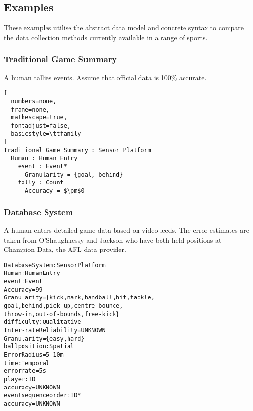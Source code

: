 \subsection{Examples}\label{data-collection}

These examples utilise the abstract data model and concrete syntax to
compare the data collection methods currently available in a range of
sports.

\subsubsection{Traditional Game Summary}\label{traditional-game-summary}

A human tallies events. Assume that official data is 100\% accurate.

\begin{lstlisting}[
  numbers=none,
  frame=none,
  mathescape=true,
  fontadjust=false,
  basicstyle=\ttfamily
]
Traditional Game Summary : Sensor Platform
  Human : Human Entry
    event : Event*
      Granularity = {goal, behind}
    tally : Count
      Accuracy = $\pm$0
\end{lstlisting}

\subsubsection{Database System}\label{database-system}

A human enters detailed game data based on video feeds. The error
estimates are taken from O'Shaughnessy \cite{oshaughnessy_possession_2006} and Jackson \cite{Jackson2016} who have both held positions at Champion Data, the AFL data provider.

\begin{alltt}
Database System : Sensor Platform
  Human : Human Entry
    event : Event
      Accuracy    = 99%
      Granularity = \{kick, mark, handball, hit, tackle,
                     goal, behind, pick-up, centre-bounce,
                     throw-in, out-of-bounds, free-kick\}
    difficulty : Qualitative
      Inter-rate Reliability = UNKNOWN
      Granularity            = \{easy, hard\}
    ball position : Spatial
      Error Radius = 5-10 m
    time : Temporal
      error rate = 5 s
    player : ID
      accuracy = UNKNOWN
    event sequence order : ID*
      accuracy = UNKNOWN
\end{alltt}

